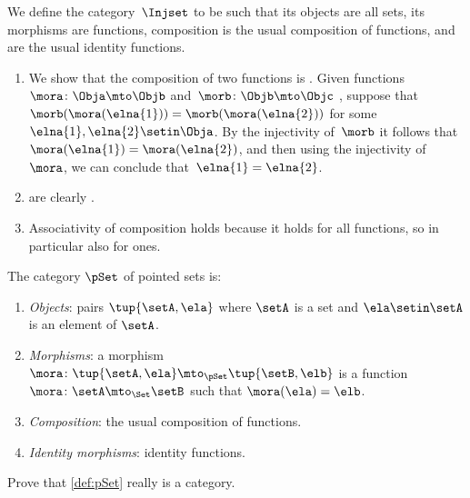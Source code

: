 \begin{solution}
    We define the category~$\Injset$ to be such that its objects are all sets, its morphisms are  functions, composition is the usual composition of functions, and  are the usual identity functions.
    \begin{enumerate}
        \item We show that the composition of two  functions is .
              Given functions~$\mora \colon \Obja \mto \Objb$ and~$\morb \colon \Objb \mto \Objc$ , suppose that~$\morb(\mora (\elna{1})) = \morb(\mora (\elna{2}))$ for some~$\elna{1}, \elna{2} \setin \Obja$.
              By the injectivity of~$\morb$ it follows that~$\mora (\elna{1}) = \mora (\elna{2})$, and then using the injectivity of~$\mora$, we can conclude that~$\elna{1} = \elna{2}$.
        \item {} are clearly .
        \item Associativity of composition holds because it holds for all functions, so in particular also for  ones.
    \end{enumerate}
\end{solution}



\begin{ctdefinition}
    \label{def:pSet}
    The category $\pSet$ of pointed sets is:
    \begin{enumerate}
        \item \emph{Objects}: pairs $\tup{\setA, \ela}$ where $\setA$ is a set and $\ela \setin \setA$ is an element of $\setA$.
        \item \emph{Morphisms}: a morphism $\mora \colon \tup{\setA, \ela} \mto_{\pSet} \tup{\setB, \elb}$ is a function $\mora \colon \setA \mto_{\Set} \setB$ such that $\mora(\ela) = \elb$.
        \item \emph{Composition}: the usual composition of functions.
        \item \emph{Identity morphisms}: identity functions.
    \end{enumerate}
\end{ctdefinition}

\begin{exercise}
    Prove that \cref{def:pSet} really is a category.
\end{exercise}

\begin{solution}
\end{solution}

